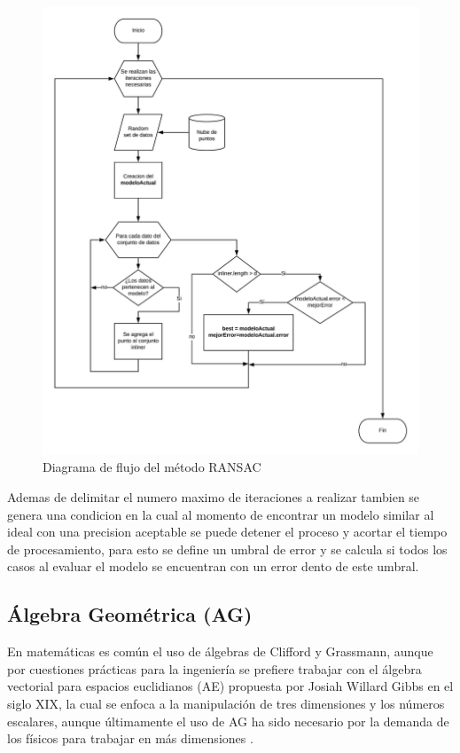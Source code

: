 \begin{figure}[!htb]
	\centering
	\includegraphics[width=1\textwidth]{01Introduccion/imagenes/RANSAC.jpeg}
	\caption{Diagrama de flujo del método RANSAC}
	\label{fig:RANSAC}
\end{figure}

Ademas de delimitar el numero maximo de iteraciones a realizar tambien se genera una condicion en la cual al momento de encontrar un modelo similar al ideal con una precision aceptable se puede detener el proceso y acortar el tiempo de procesamiento, para esto se define un umbral de error y se calcula si todos los casos al evaluar el modelo se encuentran con un error dento de este umbral.

\subsection{Álgebra Geométrica (AG)}

En matemáticas es común el uso de álgebras de Clifford y Grassmann, aunque por cuestiones prácticas para la ingeniería se prefiere trabajar con el álgebra vectorial para espacios euclidianos (AE) propuesta por Josiah Willard Gibbs en el siglo XIX, la cual se enfoca a la manipulación de tres dimensiones y los números escalares,  aunque últimamente el uso de AG ha sido necesario por la demanda de los físicos para trabajar en más dimensiones \cite{FoundOfAGC}.\\


